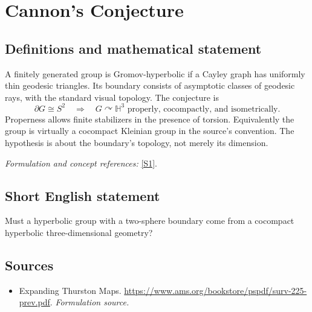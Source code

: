 \documentclass[11pt]{article}
\begin{document}
\section*{\texorpdfstring{Cannon's Conjecture}{Cannon's Conjecture}}\label{statement}
\subsection{Definitions and mathematical statement}
A finitely generated group is Gromov-hyperbolic if a Cayley graph has uniformly thin geodesic triangles. Its boundary consists of asymptotic classes of geodesic rays, with the standard visual topology. The conjecture is
\[
 \partial G\cong S^2\quad\Longrightarrow\quad
 G\curvearrowright\mathbb H^3\text{ properly, cocompactly, and isometrically}.
\]
Properness allows finite stabilizers in the presence of torsion. Equivalently the group is virtually a cocompact Kleinian group in the source's convention. The hypothesis is about the boundary's topology, not merely its dimension.
\par\smallskip\textit{Formulation and concept references:} \href{https://www.ams.org/bookstore/pspdf/surv-225-prev.pdf}{[S1]}.

\subsection{Short English statement}
Must a hyperbolic group with a two-sphere boundary come from a cocompact hyperbolic three-dimensional geometry?
\subsection{Sources}
\begin{itemize}
\item[S1]Expanding Thurston Maps.
\url{https://www.ams.org/bookstore/pspdf/surv-225-prev.pdf}.
\textit{Formulation source.}
\end{itemize}
\end{document}
